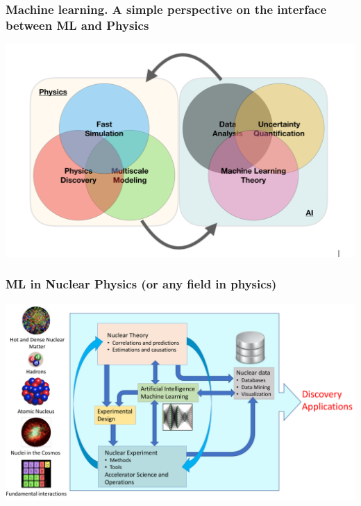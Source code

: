\documentclass{beamer}
\begin{document}
\begin{frame}
\frametitle{Machine learning. A simple perspective on the interface between ML and Physics}

\vspace{6mm}

\centerline{\includegraphics[width=1.0\linewidth]{figures/mlimage.png}}

\vspace{6mm}
\end{frame}

\begin{frame}
\frametitle{ML in Nuclear  Physics (or any field in physics)}

\vspace{6mm}

\centerline{\includegraphics[width=1.0\linewidth]{figures/ML-NP.pdf}}

\vspace{6mm}
\end{frame}
\end{document}
